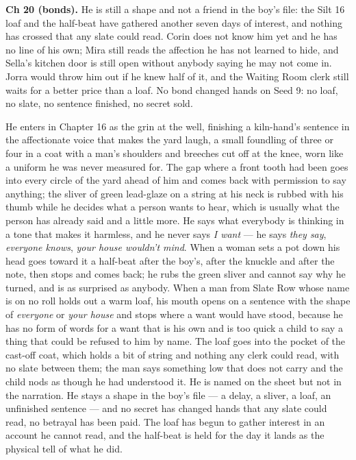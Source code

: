 \documentclass{design/chronicle}
\begin{document}
{\textbf{Ch 20 (bonds).} He is still a shape and not a friend in the boy’s file: the Silt 16 loaf and the half-beat have gathered another seven days of interest, and nothing has crossed that any slate could read. Corin does not know him yet and he has no line of his own; Mira still reads the affection he has not learned to hide, and Sella’s kitchen door is still open without anybody saying he may not come in. Jorra would throw him out if he knew half of it, and the Waiting Room clerk still waits for a better price than a loaf. No bond changed hands on Seed 9: no loaf, no slate, no sentence finished, no secret sold.

He enters in Chapter 16 as the grin at the well, finishing a kiln-hand’s sentence in the affectionate voice that makes the yard laugh, a small foundling of three or four in a coat with a man’s shoulders and breeches cut off at the knee, worn like a uniform he was never measured for. The gap where a front tooth had been goes into every circle of the yard ahead of him and comes back with permission to say anything; the sliver of green lead-glaze on a string at his neck is rubbed with his thumb while he decides what a person wants to hear, which is usually what the person has already said and a little more. He says what everybody is thinking in a tone that makes it harmless, and he never says \emph{I want} --- he says \emph{they say}, \emph{everyone knows}, \emph{your house wouldn’t mind}. When a woman sets a pot down his head goes toward it a half-beat after the boy’s, after the knuckle and after the note, then stops and comes back; he rubs the green sliver and cannot say why he turned, and is as surprised as anybody. When a man from Slate Row whose name is on no roll holds out a warm loaf, his mouth opens on a sentence with the shape of \emph{everyone} or \emph{your house} and stops where a want would have stood, because he has no form of words for a want that is his own and is too quick a child to say a thing that could be refused to him by name. The loaf goes into the pocket of the cast-off coat, which holds a bit of string and nothing any clerk could read, with no slate between them; the man says something low that does not carry and the child nods as though he had understood it. He is named on the sheet but not in the narration. He stays a shape in the boy’s file --- a delay, a sliver, a loaf, an unfinished sentence --- and no secret has changed hands that any slate could read, no betrayal has been paid. The loaf has begun to gather interest in an account he cannot read, and the half-beat is held for the day it lands as the physical tell of what he did.

}
\end{document}
